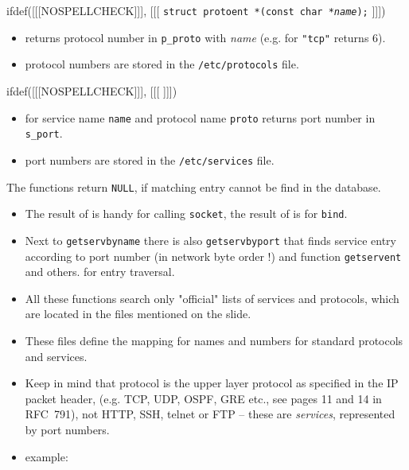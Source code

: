 \begin{slide}
ifdef([[[NOSPELLCHECK]]], [[[
\texttt{struct protoent *(const char *\emph{name});}
]]])
\begin{itemize}
\item returns protocol number in \texttt{p\_proto} with \emph{name}
(e.g. for \texttt{"tcp"} returns 6). 
\item protocol numbers are stored in the \texttt{/etc/protocols} file.
\end{itemize}
ifdef([[[NOSPELLCHECK]]], [[[
]]])
\begin{itemize}
\item for service name \texttt{name} and protocol name \texttt{proto}
returns port number in \texttt{s\_port}.
\item port numbers are stored in the \texttt{/etc/services} file.
\end{itemize}

The functions return \texttt{NULL}, if matching entry cannot be find in the
database.
\end{slide}

\begin{itemize}
\item The result of  is handy for calling \texttt{socket},
the result of  is for \texttt{bind}.
\item Next to \texttt{getservbyname} there is also \texttt{getservbyport}
that finds service entry according to port number (in network byte order !)
and function \texttt{getservent} and others. for entry traversal.
\item All these functions search only "official" lists of services and
protocols, which are located in the files mentioned on the slide.
\item These files define the mapping for names and numbers for standard
protocols and services.
\item Keep in mind that protocol is the upper layer protocol as specified in
the IP packet header, (e.g. TCP, UDP, OSPF, GRE etc., see pages 11 and 14 in
RFC~791), not HTTP, SSH, telnet or FTP -- these are \emph{services}, represented
by port numbers.
\item \label{GETBYNAME} example: 
\end{itemize}

